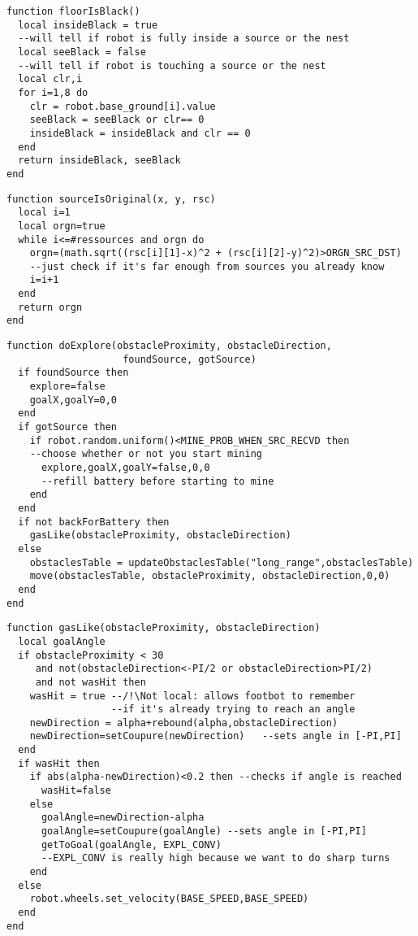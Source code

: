 \begin{subappendices}
\begin{lstlisting}[caption=Détection de la couleur du sol]
function floorIsBlack()
  local insideBlack = true
  --will tell if robot is fully inside a source or the nest
  local seeBlack = false
  --will tell if robot is touching a source or the nest
  local clr,i
  for i=1,8 do
    clr = robot.base_ground[i].value
    seeBlack = seeBlack or clr== 0
    insideBlack = insideBlack and clr == 0
  end
  return insideBlack, seeBlack
end
\end{lstlisting}


\begin{lstlisting}[caption=Vérifier l'originalité de la source]
function sourceIsOriginal(x, y, rsc)
  local i=1
  local orgn=true
  while i<=#ressources and orgn do
    orgn=(math.sqrt((rsc[i][1]-x)^2 + (rsc[i][2]-y)^2)>ORGN_SRC_DST)
    --just check if it's far enough from sources you already know
    i=i+1
  end
  return orgn
end
\end{lstlisting}


\begin{lstlisting}[caption=fonction doExplore]
function doExplore(obstacleProximity, obstacleDirection,
                    foundSource, gotSource)
  if foundSource then
    explore=false
    goalX,goalY=0,0
  end
  if gotSource then
    if robot.random.uniform()<MINE_PROB_WHEN_SRC_RECVD then
    --choose whether or not you start mining
      explore,goalX,goalY=false,0,0
      --refill battery before starting to mine
    end
  end
  if not backForBattery then
    gasLike(obstacleProximity, obstacleDirection)
  else
    obstaclesTable = updateObstaclesTable("long_range",obstaclesTable)
    move(obstaclesTable, obstacleProximity, obstacleDirection,0,0)
  end
end
\end{lstlisting}


\begin{lstlisting}[caption=Déplacement \emph{gaslike}]
function gasLike(obstacleProximity, obstacleDirection)
  local goalAngle
  if obstacleProximity < 30
     and not(obstacleDirection<-PI/2 or obstacleDirection>PI/2)
     and not wasHit then
    wasHit = true --/!\Not local: allows footbot to remember
                  --if it's already trying to reach an angle
    newDirection = alpha+rebound(alpha,obstacleDirection)
    newDirection=setCoupure(newDirection)   --sets angle in [-PI,PI]
  end
  if wasHit then
    if abs(alpha-newDirection)<0.2 then --checks if angle is reached
      wasHit=false
    else
      goalAngle=newDirection-alpha
      goalAngle=setCoupure(goalAngle) --sets angle in [-PI,PI]
      getToGoal(goalAngle, EXPL_CONV)
      --EXPL_CONV is really high because we want to do sharp turns
    end
  else
    robot.wheels.set_velocity(BASE_SPEED,BASE_SPEED)
  end
end
\end{lstlisting}


\end{subappendices}
